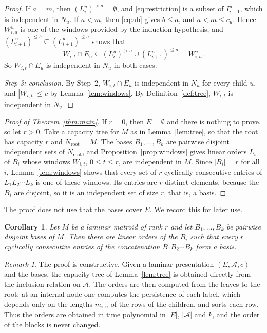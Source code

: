 \documentclass[11pt]{amsart}
\newtheorem{corollary}[theorem]{Corollary}
\theoremstyle{definition}
\theoremstyle{remark}
\newtheorem{remark}[theorem]{Remark}
\numberwithin{equation}{section}
\newcommand{\cA}{\mathcal{A}}
\begin{document}
\begin{proof}
If $a=m$, then $(L_i^u)^{>a}=\emptyset$, and \eqref{eq:restriction} is a subset of $I_{i+1}^u$, which is independent in $N_u$. If $a<m$, then \eqref{eq:ab} gives $b\le a$, and $a<m\le c_u$. Hence $W_{i,a}^u$ is one of the windows provided by the induction hypothesis, and $(L_{i+1}^u)^{\le b}\subseteq(L_{i+1}^u)^{\le a}$ shows that
\[
W_{i,t}\cap E_u\subseteq(L_i^u)^{>a}\cup(L_{i+1}^u)^{\le a}=W_{i,a}^u .
\]
So $W_{i,t}\cap E_u$ is independent in $N_u$ in both cases.

\emph{Step 3: conclusion.} By Step~2, $W_{i,t}\cap E_u$ is independent in $N_u$ for every child $u$, and $|W_{i,t}|\le c$ by Lemma~\ref{lem:windows}. By Definition~\ref{def:tree}, $W_{i,t}$ is independent in $N_v$.
\end{proof}

\begin{proof}[Proof of Theorem~\ref{thm:main}]
If $r=0$, then $E=\emptyset$ and there is nothing to prove, so let $r>0$. Take a capacity tree for $M$ as in Lemma~\ref{lem:tree}, so that the root has capacity $r$ and $N_{\mathrm{root}}=M$. The bases $B_1,\dots,B_k$ are pairwise disjoint independent sets of $N_{\mathrm{root}}$, and Proposition~\ref{prop:windows} gives linear orders $L_i$ of $B_i$ whose windows $W_{i,t}$, $0\le t\le r$, are independent in $M$. Since $|B_i|=r$ for all $i$, Lemma~\ref{lem:windows} shows that every set of $r$ cyclically consecutive entries of $L_1L_2\cdots L_k$ is one of these windows. Its entries are $r$ distinct elements, because the $B_i$ are disjoint, so it is an independent set of size $r$, that is, a basis.
\end{proof}

The proof does not use that the bases cover $E$. We record this for later use.

\begin{corollary}\label{cor:disjoint}
Let $M$ be a laminar matroid of rank $r$ and let $B_1,\dots,B_k$ be pairwise disjoint bases of $M$. Then there are linear orders of the $B_i$ such that every $r$ cyclically consecutive entries of the concatenation $B_1B_2\cdots B_k$ form a basis.
\end{corollary}

\begin{remark}\label{rem:algorithm}
The proof is constructive. Given a laminar presentation $(E,\cA,c)$ and the bases, the capacity tree of Lemma~\ref{lem:tree} is obtained directly from the inclusion relation on $\cA$. The orders are then computed from the leaves to the root: at an internal node one computes the persistence of each label, which depends only on the lengths $m_{i,u}$ of the rows of the children, and sorts each row. Thus the orders are obtained in time polynomial in $|E|$, $|\cA|$ and $k$, and the order of the blocks is never changed.
\end{remark}
\end{document}
